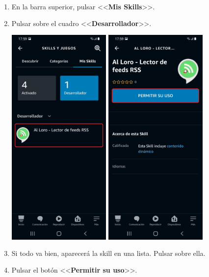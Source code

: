 \documentclass[11pt,spanish,listoffigures,listoftables,table,hyphens,dvipsnames]{tfgetsinf}
\begin{document}
\begin{enumerate}
   \item En la barra superior, pulsar <<\textbf{Mis Skills}>>.
   \item Pulsar sobre el cuadro <<\textbf{Desarrollador}>>.
   
   \includegraphics[width=0.4\textwidth]{activate-skill-5.jpg}
   \includegraphics[width=0.4\textwidth]{activate-skill-6.jpg}

   \item Si todo va bien, aparecerá la skill en una lista. Pulsar sobre ella.
   \item Pulsar el botón <<\textbf{Permitir su uso}>>.
\end{enumerate}
\end{document}
